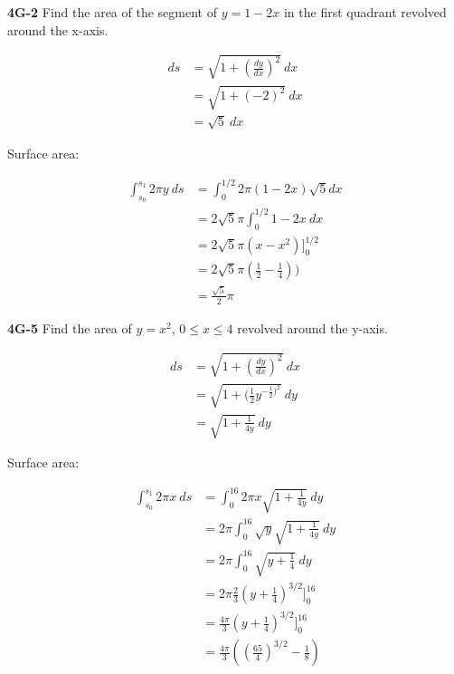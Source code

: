 \documentclass[9pt]{article}
\begin{document}
\begin{tcolorbox}
  \textbf{4G-2} Find the area of the segment of $y = 1 - 2x$ in the first quadrant revolved around the x-axis.
\end{tcolorbox}

\begin{align*}
  ds &= \sqrt{1 + (\frac{dy}{dx})^2} \ dx \\
  &= \sqrt{1 + (-2)^2} \ dx \\
  &= \sqrt{5} \ dx
\end{align*}

Surface area:

\begin{align*}
  \int_{s_0}^{s_1} 2 \pi y \ ds &= \int_{0}^{1/2} 2 \pi (1 - 2x) \sqrt{5} dx \\
  &= 2 \sqrt{5} \pi \int_{0}^{1/2} 1 - 2x \ dx \\
  &= 2 \sqrt{5} \pi (x - x^2) \bigg]_{0}^{1/2} \\
  &= 2 \sqrt{5} \pi (\frac{1}{2} - \frac{1}{4})) \\
  &= \frac{\sqrt{5}}{2} \pi
\end{align*}


\begin{tcolorbox}
  \textbf{4G-5} Find the area of $y = x^2$, $0 \leq x \leq 4$ revolved around the y-axis.
\end{tcolorbox}

\begin{align*}
  ds &= \sqrt{1 + (\frac{dy}{dx})^2} \ dx \\
  &= \sqrt{1 + (\frac{1}{2}y^{-\frac{1}{2})^2}} \ dy \\
  &= \sqrt{1 + \frac{1}{4y}} \ dy
\end{align*}

Surface area:

\begin{align*}
  \int_{s_0}^{s_1} 2 \pi x \ ds &= \int_{0}^{16} 2 \pi x \sqrt{1 + \frac{1}{4y}} \ dy \\
  &= 2 \pi \int_{0}^{16} \sqrt{y} \sqrt{1 + \frac{1}{4y}} \ dy \\
  &= 2 \pi \int_{0}^{16} \sqrt{y + \frac{1}{4}} \ dy \\
  &= 2 \pi \frac{2}{3} (y + \frac{1}{4})^{3/2} \bigg]_{0}^{16} \\
  &= \frac{4 \pi}{3} (y + \frac{1}{4})^{3/2} \bigg]_{0}^{16} \\
  &= \frac{4 \pi}{3} ((\frac{65}{4})^{3/2} - \frac{1}{8})
\end{align*}
\end{document}
